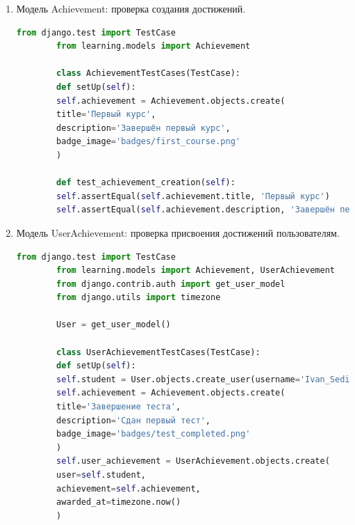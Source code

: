 \begin{enumerate}
\begin{lstlisting}[language=Python, caption=Модульный тест для StudentProgress, label=lst:studentprogress_test]
		User = get_user_model()
		
		class StudentProgressTestCases(TestCase):
		def setUp(self):
		self.teacher = User.objects.create_user(username='sonya1', password='vanya232323', is_teacher=True)
		self.student = User.objects.create_user(username='Ivan_Sedih', password='vanya232323', is_student=True)
		self.course = Course.objects.create(title='Типы данных', description='Описание курса', creator=self.teacher)
		self.lesson = Lesson.objects.create(title='Переменные', content='Содержимое урока', order=1, course=self.course)
		self.progress = StudentProgress.objects.create(
		student=self.student,
		lesson=self.lesson,
		completed=True,
		completed_at=timezone.now()
		)
		
		def test_studentprogress_creation(self):
		self.assertTrue(self.progress.completed)
		self.assertEqual(self.progress.student, self.student)
		self.assertEqual(self.progress.lesson, self.lesson)
	\end{lstlisting}
	
	\item Модель Achievement: проверка создания достижений.
	\begin{lstlisting}[language=Python, caption=Модульный тест для Achievement, label=lst:achievement_test]
		from django.test import TestCase
		from learning.models import Achievement
		
		class AchievementTestCases(TestCase):
		def setUp(self):
		self.achievement = Achievement.objects.create(
		title='Первый курс',
		description='Завершён первый курс',
		badge_image='badges/first_course.png'
		)
		
		def test_achievement_creation(self):
		self.assertEqual(self.achievement.title, 'Первый курс')
		self.assertEqual(self.achievement.description, 'Завершён первый курс')
	\end{lstlisting}
	
	\item Модель UserAchievement: проверка присвоения достижений пользователям.
	\begin{lstlisting}[language=Python, caption=Модульный тест для UserAchievement, label=lst:userachievement_test]
		from django.test import TestCase
		from learning.models import Achievement, UserAchievement
		from django.contrib.auth import get_user_model
		from django.utils import timezone
		
		User = get_user_model()
		
		class UserAchievementTestCases(TestCase):
		def setUp(self):
		self.student = User.objects.create_user(username='Ivan_Sedih', password='vanya232323', is_student=True)
		self.achievement = Achievement.objects.create(
		title='Завершение теста',
		description='Сдан первый тест',
		badge_image='badges/test_completed.png'
		)
		self.user_achievement = UserAchievement.objects.create(
		user=self.student,
		achievement=self.achievement,
		awarded_at=timezone.now()
		)
		

\end{lstlisting}
\end{enumerate}
